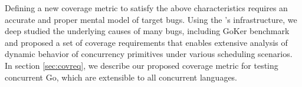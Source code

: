 Defining a new coverage metric to satisfy the above characteristics requires an accurate and proper mental model of target bugs.
%
Using the \goat's infrastructure, we deep studied the underlying causes of many bugs, including GoKer benchmark~\cite{yuan-gobench-cgo21} and proposed a set of coverage requirements that enables extensive analysis of dynamic behavior of concurrency primitives under various scheduling scenarios.
%
In section \ref{sec:covreq}, we describe our proposed coverage metric for testing concurrent Go, which are extensible to all concurrent languages.
